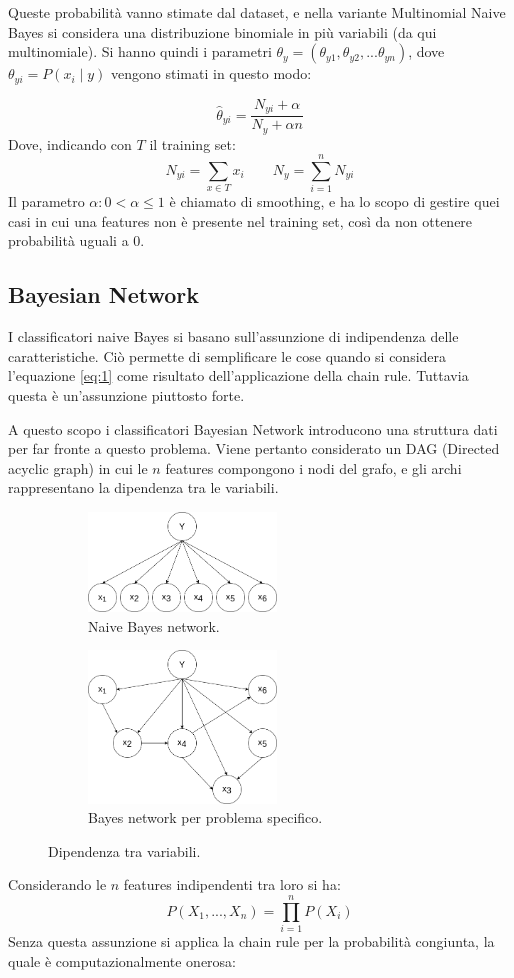 \documentclass[oneside]{book}
\begin{document}
Queste probabilità vanno stimate dal dataset, e nella variante Multinomial Naive Bayes si considera una distribuzione binomiale in più variabili (da qui multinomiale). Si hanno quindi i parametri $\theta_y = (\theta_{y1}, \theta_{y2}, ...\theta_{yn})$, dove $\theta_{yi} = P(x_i \mid y)$ vengono stimati in questo modo:

$$\hat{\theta}_{yi} = \frac{N_{yi} + \alpha }{N_{y} + \alpha n}$$
Dove, indicando con $T$ il training set:
$$N_{yi} = \sum_{x \in T}x_i \qquad
N_{y} = \sum_{i=1}^{n}N_{yi}$$
Il parametro $\alpha: 0 < \alpha \leq 1$ è chiamato di smoothing, e ha lo scopo di gestire quei casi in cui una features non è presente nel training set, così da non ottenere probabilità uguali a $0$.

\newpage
\subsection{Bayesian Network}
I classificatori naive Bayes si basano sull'assunzione di indipendenza delle caratteristiche. Ciò permette di semplificare le cose quando si considera l'equazione \eqref{eq:1} come risultato dell'applicazione della chain rule.
Tuttavia questa è un'assunzione piuttosto forte.

A questo scopo i classificatori Bayesian Network introducono una struttura dati per far fronte a questo problema. Viene pertanto considerato un DAG (Directed acyclic graph) in cui le $n$ features compongono i nodi del grafo, e gli archi rappresentano la dipendenza tra le variabili.

\begin{figure}[!h]
	\centering
	\begin{subfigure}[b]{0.4\textwidth}
		\centering
		\includegraphics[width=5cm]{assets/naive-bayes.png}
		\caption{Naive Bayes network.}
		\label{fig:naive-bayes}
	\end{subfigure}
	\hspace{4em}
	\begin{subfigure}[b]{0.4\textwidth}
	\centering
		\includegraphics[width=5cm]{assets/bayes-network.png}
		\caption{Bayes network per problema specifico.}
		\label{fig:naive-bayes}
	\end{subfigure}
	\caption{Dipendenza tra variabili.}
\end{figure}
\noindent Considerando le $n$ features indipendenti tra loro si ha:
$$P(X_1, ..., X_n) = \prod\limits_{i=1}^{n}P(X_i) $$
Senza questa assunzione si applica la chain rule per la probabilità congiunta, la quale è computazionalmente onerosa:
\end{document}
